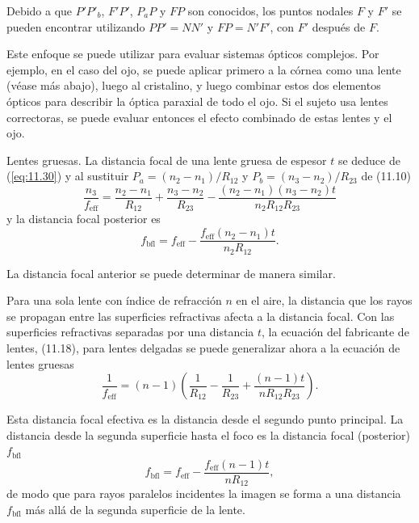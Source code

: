 \documentclass[12pt]{book}
\begin{document}
Debido a que $P' P'_b$, $F' P'$, $P_a P$ y $FP$ son conocidos, los puntos nodales $F$ y $F'$ se pueden encontrar utilizando $PP' = NN'$ y $FP = N'F'$, con $F'$ después de $F$.

Este enfoque se puede utilizar para evaluar sistemas ópticos complejos. Por ejemplo, en el caso del ojo, se puede aplicar primero a la córnea como una lente (véase más abajo), luego al cristalino, y luego combinar estos dos elementos ópticos para describir la óptica paraxial de todo el ojo. Si el sujeto usa lentes correctoras, se puede evaluar entonces el efecto combinado de estas lentes y el ojo.

Lentes gruesas. La distancia focal de una lente gruesa de espesor $t$ se deduce de (\ref{eq:11.30}) y al sustituir $P_a = (n_2 - n_1)/R_{12}$ y $P_b = (n_3 - n_2)/R_{23}$ de (11.10)
\begin{equation}
\label{eq:11.41}
\frac{n_3}{f_{\text{eff}}} = \frac{n_2 - n_1}{R_{12}} + \frac{n_3 - n_2}{R_{23}} - \frac{(n_2 - n_1)(n_3 - n_2)t}{n_2 R_{12} R_{23}}
\end{equation}
y la distancia focal posterior es
\begin{equation}
\label{eq:11.42}
f_{\text{bfl}} = f_{\text{eff}} - \frac{f_{\text{eff}}(n_2 - n_1)t}{n_2 R_{12}}.
\end{equation}

La distancia focal anterior se puede determinar de manera similar.

Para una sola lente con índice de refracción $n$ en el aire, la distancia que los rayos se propagan entre las superficies refractivas afecta a la distancia focal. Con las superficies refractivas separadas por una distancia $t$, la ecuación del fabricante de lentes, (11.18), para lentes delgadas se puede generalizar ahora a la ecuación de lentes gruesas
\begin{equation}
\label{eq:11.43}
\frac{1}{f_{\text{eff}}} = (n - 1) \left( \frac{1}{R_{12}} - \frac{1}{R_{23}} + \frac{(n - 1)t}{n R_{12} R_{23}} \right).
\end{equation}

Esta distancia focal efectiva es la distancia desde el segundo punto principal. La distancia desde la segunda superficie hasta el foco es la distancia focal (posterior) $f_{\text{bfl}}$
\begin{equation}
\label{eq:11.44}
f_{\text{bfl}} = f_{\text{eff}} - \frac{f_{\text{eff}}(n - 1)t}{n R_{12}},
\end{equation}
de modo que para rayos paralelos incidentes la imagen se forma a una distancia $f_{\text{bfl}}$ más allá de la segunda superficie de la lente.
\end{document}

